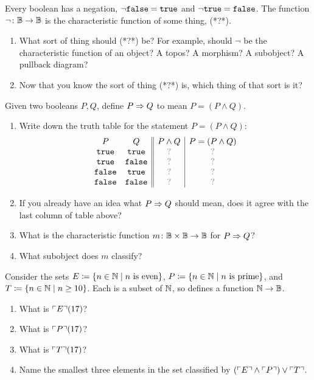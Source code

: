 \documentclass[7Sketches]{subfiles}
\begin{document}
\begin{exercise}%
%
\label{exc.neg_char}
Every boolean has a negation, $\neg\mathtt{false}=\mathtt{true}$ and $\neg\mathtt{true}=\mathtt{false}$. The function $\neg\colon\mathbb{B}\to\mathbb{B}$ is the characteristic function of some thing, (*?*).
\begin{enumerate}
	\item What sort of thing should (*?*) be? For example, should $\neg$ be the characteristic function of an object? A topos? A morphism? A subobject? A pullback diagram?
	\item Now that you know the sort of thing (*?*) is, which thing of that sort is it?
\qedhere
\end{enumerate}
\end{exercise}


\begin{exercise}%
%
\label{exc.implies_char}%
Given two booleans $P,Q$, define $P\Rightarrow Q$ to mean $P=(P\wedge Q)$.
\begin{enumerate}
	\item Write down the truth table for the statement $P=(P\wedge Q)$:
	\[
	\begin{array}{cc||c|c}
		P&Q&P\wedge Q&P=(P\wedge Q)\\
		\true&\true&\?&\?\\
		\true&\false&\?&\?\\
		\false&\true&\?&\?\\
		\false&\false&\?&\?\\
	\end{array}
	\]
	\item If you already have an idea what $P\Rightarrow Q$ should mean, does it agree with the last column of table above?
	\item What is the characteristic function $m\colon \mathbb{B}\times\mathbb{B}\to\mathbb{B}$ for $P\Rightarrow Q$?
	\item What subobject does $m$ classify?
\qedhere
\end{enumerate}
\end{exercise}


\begin{exercise}%
\label{exc.even_prime_10}
Consider the sets $E\coloneqq\{n\in\mathbb{N}\mid n\text{ is even}\}$, $P\coloneqq\{n\in\mathbb{N}\mid n\text{ is prime}\}$, and $T\coloneqq\{n\in\mathbb{N}\mid n\geq 10\}$. Each is a subset of $\mathbb{N}$, so defines a function $\mathbb{N}\to\mathbb{B}$.
\begin{enumerate}
	\item What is $\ulcorner E\urcorner(17)$?
	\item What is $\ulcorner P\urcorner(17)$?
	\item What is $\ulcorner T\urcorner(17)$?
	\item Name the smallest three elements in the set classified by $(\ulcorner E\urcorner\wedge\ulcorner P\urcorner)\vee\ulcorner T\urcorner$.
\qedhere
\end{enumerate}
\end{exercise}
\end{document}
